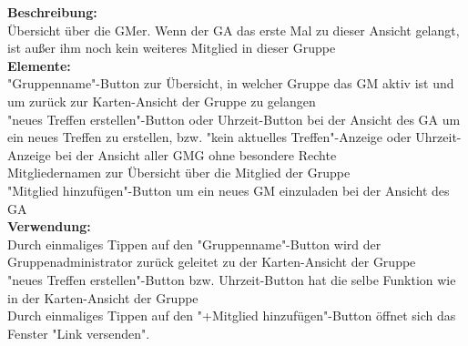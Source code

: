\textbf{Beschreibung:}\\
Übersicht über die GMer. Wenn der GA das erste Mal zu dieser Ansicht gelangt, ist außer ihm noch kein weiteres Mitglied in dieser Gruppe\\
\textbf{Elemente:}\\
"Gruppenname"-Button zur Übersicht, in welcher Gruppe das GM aktiv ist und um zurück zur Karten-Ansicht der Gruppe zu gelangen\\
"neues Treffen erstellen"-Button oder Uhrzeit-Button bei der Ansicht des GA um ein neues Treffen zu erstellen, bzw. "kein aktuelles Treffen"-Anzeige oder Uhrzeit-Anzeige bei der Ansicht aller GMG ohne besondere Rechte\\
Mitgliedernamen zur Übersicht über die Mitglied der Gruppe\\
"Mitglied hinzufügen"-Button um ein neues GM einzuladen bei der Ansicht des GA\\
\textbf{Verwendung:}\\
Durch einmaliges Tippen auf den "Gruppenname"-Button wird der Gruppenadministrator zurück geleitet zu der Karten-Ansicht der Gruppe\\
"neues Treffen erstellen"-Button bzw. Uhrzeit-Button hat die selbe Funktion wie in der Karten-Ansicht der Gruppe\\
Durch einmaliges Tippen auf den "+Mitglied hinzufügen"-Button öffnet sich das Fenster "Link versenden".
\newpage



